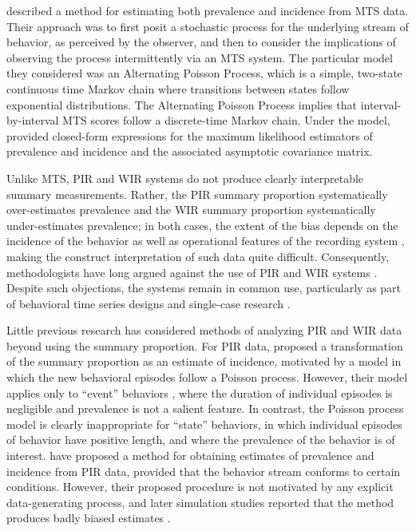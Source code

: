 \documentclass[man, noextraspace, floatsintext]{apa6}\usepackage[]{graphicx}\usepackage[]{color}
\begin{document}
\citet{Brown1977estimation} described a method for estimating both prevalence and incidence from MTS data. Their approach was to first posit a stochastic process for the underlying stream of behavior, as perceived by the observer, and then to consider the implications of observing the process intermittently via an MTS system. The particular model they considered was an Alternating Poisson Process, which is a simple, two-state continuous time Markov chain where transitions between states follow exponential distributions. The Alternating Poisson Process implies that interval-by-interval MTS scores follow a discrete-time Markov chain. Under the model, \citet[see also \citealp{Griffin1983parametric}]{Brown1977estimation} provided closed-form expressions for the maximum likelihood estimators of prevalence and incidence and the associated asymptotic covariance matrix.

Unlike MTS, PIR and WIR systems do not produce clearly interpretable summary measurements. Rather, the PIR summary proportion systematically over-estimates prevalence and the WIR summary proportion systematically under-estimates prevalence; in both cases, the extent of the bias depends on the incidence of the behavior as well as operational features of the recording system \citep{Kraemer1979one, Rogosa1991statistical}, making the construct interpretation of such data quite difficult. Consequently, methodologists have long argued against the use of PIR and WIR systems \citep[cf.]{Altmann1974observational, Mann1991time, Lane2014using}. Despite such objections, the systems remain in common use, particularly as part of behavioral time series designs and single-case research \citep{Rapp2007interval, Mudford2009continuous, Lane2014using}. 

Little previous research has considered methods of analyzing PIR and WIR data beyond using the summary proportion. For PIR data, \citet{Altmann1970estimating} proposed a transformation of the summary proportion as an estimate of incidence, motivated by a model in which the new behavioral episodes follow a Poisson process. However, their model applies only to ``event'' behaviors \citep{Altmann1974observational}, where the duration of individual episodes is negligible and prevalence is not a salient feature. In contrast, the Poisson process model is clearly inappropriate for ``state'' behaviors, in which individual episodes of behavior have positive length, and where the prevalence of the behavior is of interest. \citet{Suen1986post, Suen1989analyzing} have proposed a method for obtaining estimates of prevalence and incidence from PIR data, provided that the behavior stream conforms to certain conditions. However, their proposed procedure is not motivated by any explicit data-generating process, and later simulation studies reported that the method produces badly biased estimates \citep[sec. 5.2]{Rogosa1991statistical}. 
\end{document}
